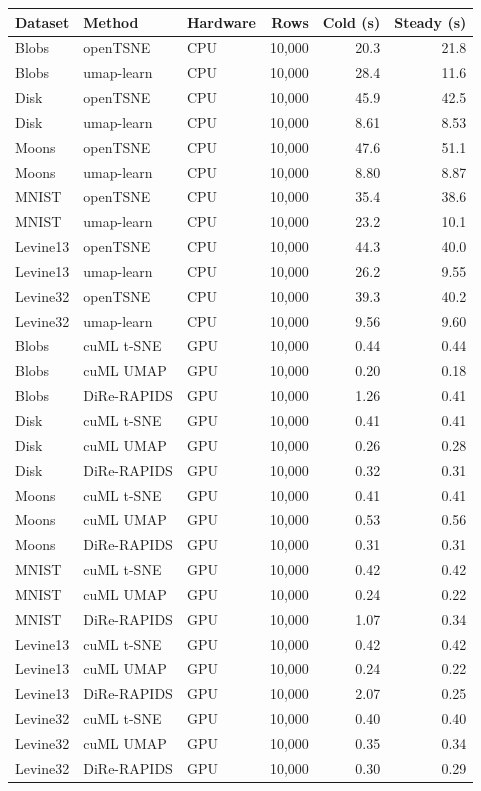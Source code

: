 \begin{tabular}{@{}lllrrr@{}}
\toprule
Dataset & Method & Hardware & Rows & Cold (s) & Steady (s) \\
\midrule
Blobs & openTSNE & CPU & 10,000 & 20.3 & 21.8 \\
Blobs & umap-learn & CPU & 10,000 & 28.4 & 11.6 \\
Disk & openTSNE & CPU & 10,000 & 45.9 & 42.5 \\
Disk & umap-learn & CPU & 10,000 & 8.61 & 8.53 \\
Moons & openTSNE & CPU & 10,000 & 47.6 & 51.1 \\
Moons & umap-learn & CPU & 10,000 & 8.80 & 8.87 \\
MNIST & openTSNE & CPU & 10,000 & 35.4 & 38.6 \\
MNIST & umap-learn & CPU & 10,000 & 23.2 & 10.1 \\
Levine13 & openTSNE & CPU & 10,000 & 44.3 & 40.0 \\
Levine13 & umap-learn & CPU & 10,000 & 26.2 & 9.55 \\
Levine32 & openTSNE & CPU & 10,000 & 39.3 & 40.2 \\
Levine32 & umap-learn & CPU & 10,000 & 9.56 & 9.60 \\
\addlinespace
Blobs & cuML t-SNE & GPU & 10,000 & 0.44 & 0.44 \\
Blobs & cuML UMAP & GPU & 10,000 & 0.20 & 0.18 \\
Blobs & DiRe-RAPIDS & GPU & 10,000 & 1.26 & 0.41 \\
Disk & cuML t-SNE & GPU & 10,000 & 0.41 & 0.41 \\
Disk & cuML UMAP & GPU & 10,000 & 0.26 & 0.28 \\
Disk & DiRe-RAPIDS & GPU & 10,000 & 0.32 & 0.31 \\
Moons & cuML t-SNE & GPU & 10,000 & 0.41 & 0.41 \\
Moons & cuML UMAP & GPU & 10,000 & 0.53 & 0.56 \\
Moons & DiRe-RAPIDS & GPU & 10,000 & 0.31 & 0.31 \\
MNIST & cuML t-SNE & GPU & 10,000 & 0.42 & 0.42 \\
MNIST & cuML UMAP & GPU & 10,000 & 0.24 & 0.22 \\
MNIST & DiRe-RAPIDS & GPU & 10,000 & 1.07 & 0.34 \\
Levine13 & cuML t-SNE & GPU & 10,000 & 0.42 & 0.42 \\
Levine13 & cuML UMAP & GPU & 10,000 & 0.24 & 0.22 \\
Levine13 & DiRe-RAPIDS & GPU & 10,000 & 2.07 & 0.25 \\
Levine32 & cuML t-SNE & GPU & 10,000 & 0.40 & 0.40 \\
Levine32 & cuML UMAP & GPU & 10,000 & 0.35 & 0.34 \\
Levine32 & DiRe-RAPIDS & GPU & 10,000 & 0.30 & 0.29 \\
\bottomrule
\end{tabular}

